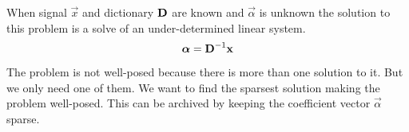 When signal $\vec{x}$ and dictionary $\boldsymbol{\mathrm{D}}$ are known 
and $\vec{\alpha}$ is unknown the solution to this problem is a solve of an
under-determined linear system.
\begin{equation}
 \boldsymbol{\mathrm{\alpha}} = \boldsymbol{\mathrm{D}}^{-1}\boldsymbol{\mathrm{x}}\label{eq:problem} 
\end{equation}
The problem is not well-posed because there is more than one
solution to it. %
But we only need one of them. We want to find the sparsest
solution making the problem well-posed. This can be archived by keeping
the coefficient vector $\vec{\alpha}$ sparse. 





